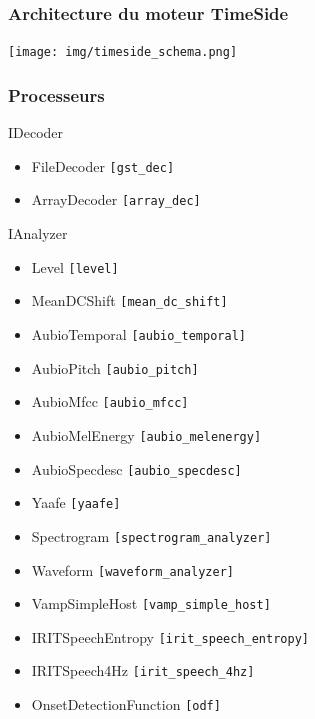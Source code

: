 \documentclass[10pt, final, hyperref, table]{beamer}
\begin{document}
\begin{frame}
  \frametitle{Architecture du moteur TimeSide}
  \begin{center}
    \texttt{[image: img/timeside\_schema.png]}
  \end{center}
\end{frame}
\begin{frame}\tiny
  \frametitle{Processeurs}
  \begin{minipage}{0.45\linewidth}

   \begin{block}{IDecoder}
      \begin{itemize}
      \item FileDecoder \texttt{[gst\_dec]}
      \item \alert{ArrayDecoder} \texttt{[array\_dec]}
      \end{itemize}
    \end{block}
    \begin{block}{IAnalyzer}
      \begin{itemize}
      \item Level \texttt{[level]}
      \item MeanDCShift \texttt{[mean\_dc\_shift]}
      \item AubioTemporal \texttt{[aubio\_temporal]}
      \item AubioPitch \texttt{[aubio\_pitch]}
      \item AubioMfcc \texttt{[aubio\_mfcc]}
        \item AubioMelEnergy \texttt{[aubio\_melenergy]}
      \item AubioSpecdesc \texttt{[aubio\_specdesc]}
      \item \alert{Yaafe} \texttt{[yaafe]}
      \item \alert{Spectrogram} \texttt{[spectrogram\_analyzer]}
      \item \alert{Waveform} \texttt{[waveform\_analyzer]}
      \item \alert{VampSimpleHost} \texttt{[vamp\_simple\_host]}
      \item \alert{IRITSpeechEntropy} \texttt{[irit\_speech\_entropy]}
      \item \alert{IRITSpeech4Hz} \texttt{[irit\_speech\_4hz]}
      \item \alert{OnsetDetectionFunction} \texttt{[odf]}
      \end{itemize}
    \end{block}
   \end{minipage} \hfill
   \begin{minipage}{0.5\linewidth}

\end{minipage}
\end{frame}
\end{document}
